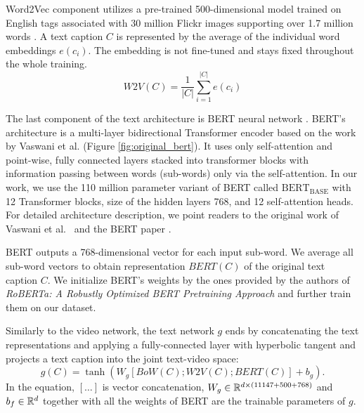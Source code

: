 Word2Vec component utilizes a pre-trained 500-dimensional model trained on English tags associated with 30 million Flickr images supporting over 1.7 million words \cite{Dong2018}. A text caption $C$ is represented by the average of the individual word embeddings $e(c_i)$. The embedding is not fine-tuned and stays fixed throughout the whole training.
\begin{equation}
    W2V(C)=\frac{1}{|C|}\sum_{i=1}^{|C|}e(c_i)
\end{equation}

The last component of the text architecture is BERT neural network \cite{bert}. BERT's architecture is a multi-layer bidirectional Transformer encoder based on the work by Vaswani et al. \cite{AttentionisAllyouNeed} (Figure \ref{fig:original_bert}). It uses only self-attention and point-wise, fully connected layers stacked into transformer blocks with information passing between words (sub-words) only via the self-attention. In our work, we use the 110 million parameter variant of BERT called $\mathrm{BERT_{BASE}}$ with 12 Transformer blocks, size of the hidden layers 768, and 12 self-attention heads. For detailed architecture description, we point readers to the original work of Vaswani et al.~\cite{AttentionisAllyouNeed} and the BERT paper \cite{bert}.

BERT outputs a 768-dimensional vector for each input sub-word. We average all sub-word vectors to obtain representation $BERT(C)$ of the original text caption $C$.
We initialize BERT's weights by the ones provided by the authors of \textit{RoBERTa: A Robustly Optimized BERT Pretraining Approach} \cite{RoBERTa} and further train them on our dataset.

Similarly to the video network, the text network $g$ ends by concatenating the text representations and applying a fully-connected layer with hyperbolic tangent and projects a text caption into the joint text-video space:
\begin{equation}
    g(C)=\tanh\left(W_g\left[BoW(C); W2V(C); BERT(C)\right]+b_g\right).
\end{equation}
In the equation, $\left[\ldots\right]$ is vector concatenation, $W_g\in\mathbb{R}^{d\times (11147+500+768)}$ and $b_f\in \mathbb{R}^d$ together with all the weights of BERT are the trainable parameters of $g$.

